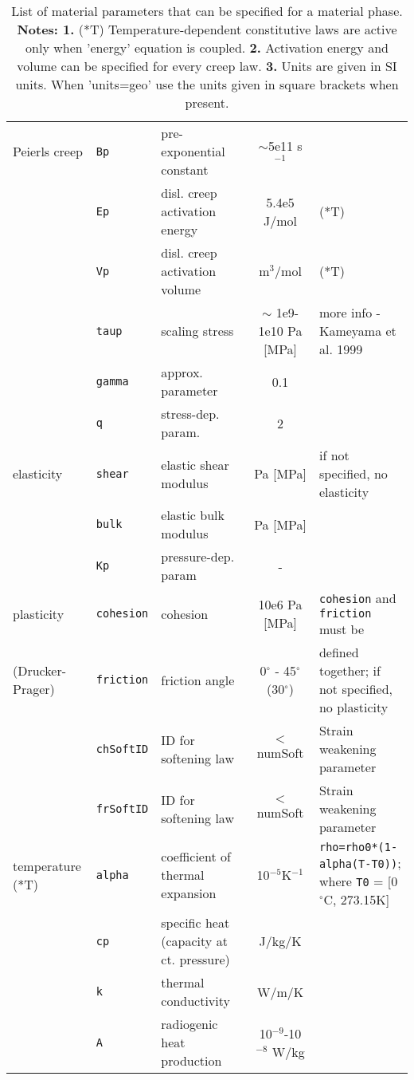 \documentclass[a4paper,11pt]{article}
\begin{document}
\begin{table}[H]
\begin{center}
{\begin{tabular}{p{2.7cm} p{2cm} p{3cm} c p{5cm}}
\hdashline
Peierls creep&\texttt{Bp}&pre-exponential constant&$\sim$5e11 s$^{-1}$&\\
&\texttt{Ep}&disl. creep activation energy&5.4e5 J/mol&(*T) \\
&\texttt{Vp}&disl. creep activation volume&m$^3$/mol&(*T) \\
&\texttt{taup}&scaling stress&$\sim$ 1e9-1e10 Pa [MPa]& more info - Kameyama et al. 1999 \\
&\texttt{gamma}&approx. parameter&0.1& \\
&\texttt{q}&stress-dep. param.&2& \\

\hdashline
elasticity&\texttt{shear}&elastic shear modulus&Pa [MPa]&if not specified, no elasticity\\
&\texttt{bulk}&elastic bulk modulus&Pa [MPa]&\\
&\texttt{Kp}&pressure-dep. param&-&\\

\hdashline
plasticity &\texttt{cohesion}&cohesion&10e6 Pa [MPa]&\texttt{cohesion} and \texttt{friction} must be \\
(Drucker-Prager)&\texttt{friction}&friction angle&0$^\circ$ - 45$^\circ$ (30$^\circ$)&defined together; if not specified, no plasticity\\
&\texttt{chSoftID}&ID for softening law&$<$ numSoft&Strain weakening parameter\\
&\texttt{frSoftID}&ID for softening law&$<$ numSoft&Strain weakening parameter\\


\hdashline
temperature  (*T)&\texttt{alpha}&coefficient of thermal expansion&10$^{-5}$K$^{-1}$&\texttt{rho=rho0*(1-alpha(T-T0))}; where \texttt{T0} = [0$^\circ$C, 273.15K]\\
&\texttt{cp}&specific heat (capacity at ct. pressure)&J/kg/K&\\
&\texttt{k}&thermal conductivity&W/m/K&\\
&\texttt{A}&radiogenic heat production&10$^{-9}$-10$^{-8}$ W/kg &\\

 \hline
     \end{tabular}
     }
  \caption{List of material parameters that can be specified for a material phase. \textbf{Notes: 1.} (*T) Temperature-dependent constitutive laws are active only when 'energy' equation is coupled. \textbf{2.} Activation energy and volume can be specified for every creep law. \textbf{3.} Units are given in SI units. When 'units=geo' use the units given in square brackets when present. }
  \label{tab:matprops}
  \end{center}
\end{table}
\end{document}
